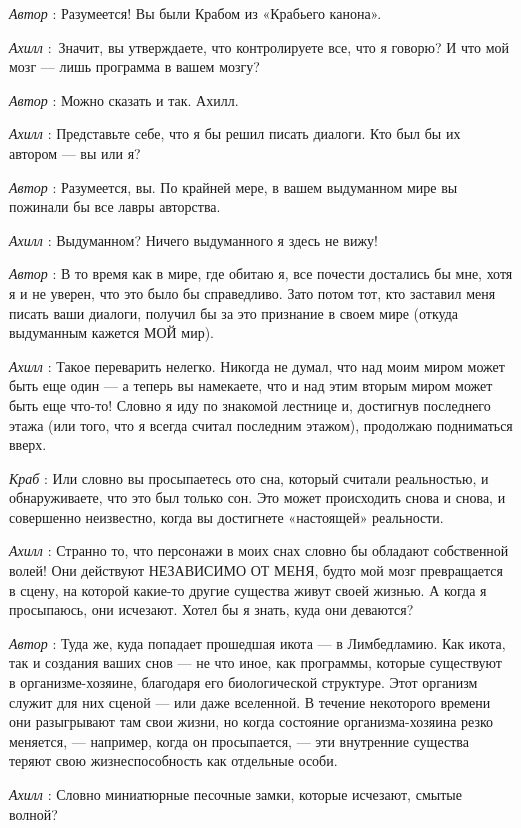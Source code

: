 \documentclass[../main.tex]{subfiles}
\begin{document}
\begin{dialogue}
\emph{Автор} : Разумеется! Вы были Крабом из «Крабьего канона».

\emph{Ахилл} :~Значит, вы утверждаете, что контролируете все, что я говорю? И что мой мозг --- лишь программа в вашем мозгу?

\emph{Автор} : Можно сказать и так. Ахилл.

\emph{Ахилл} : Представьте себе, что я бы решил писать диалоги. Кто был бы их автором --- вы или я?

\emph{Автор} : Разумеется, вы. По крайней мере, в вашем выдуманном мире вы пожинали бы все лавры авторства.

\emph{Ахилл} : Выдуманном? Ничего выдуманного я здесь не вижу!

\emph{Автор} : В то время как в мире, где обитаю я, все почести достались бы мне, хотя я и не уверен, что это было бы справедливо. Зато потом тот, кто заставил меня писать ваши диалоги, получил бы за это признание в своем мире (откуда выдуманным кажется МОЙ мир).

\emph{Ахилл} : Такое переварить нелегко. Никогда не думал, что над моим миром может быть еще один --- а теперь вы намекаете, что и над этим вторым миром может быть еще что-то! Словно я иду по знакомой лестнице и, достигнув последнего этажа (или того, что я всегда считал последним этажом), продолжаю подниматься вверх.

\emph{Краб} : Или словно вы просыпаетесь ото сна, который считали реальностью, и обнаруживаете, что это был только сон. Это может происходить снова и снова, и совершенно неизвестно, когда вы достигнете «настоящей» реальности.

\emph{Ахилл} : Странно то, что персонажи в моих снах словно бы обладают собственной волей! Они действуют НЕЗАВИСИМО ОТ МЕНЯ, будто мой мозг превращается в сцену, на которой какие-то другие существа живут своей жизнью. А когда я просыпаюсь, они исчезают. Хотел бы я знать, куда они деваются?

\emph{Автор} : Туда же, куда попадает прошедшая икота --- в Лимбедламию. Как икота, так и создания ваших снов --- не что иное, как программы, которые существуют в организме-хозяине, благодаря его биологической структуре. Этот организм служит для них сценой --- или даже вселенной. В течение некоторого времени они разыгрывают там свои жизни, но когда состояние организма-хозяина резко меняется, --- например, когда он просыпается, --- эти внутренние существа теряют свою жизнеспособность как отдельные особи.

\emph{Ахилл} : Словно миниатюрные песочные замки, которые исчезают, смытые волной?


\end{dialogue}
\end{document}
